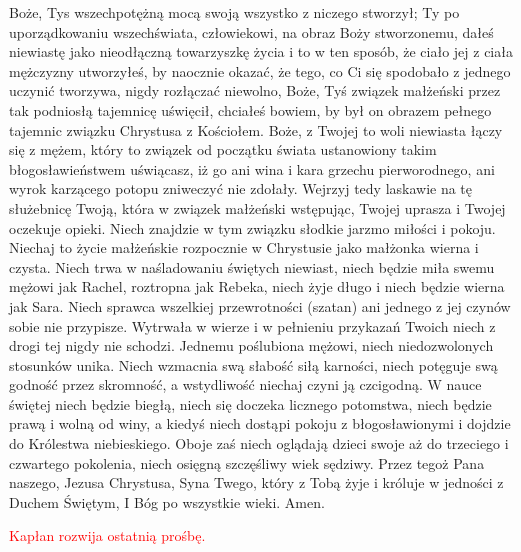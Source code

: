 \begin{Parallel}[v]{0.485\textwidth}{0.485\textwidth}
{Boże, Tys wszechpotężną mocą swoją wszystko z niczego stworzył; Ty po uporządkowaniu wszechświata, człowiekowi, na obraz Boży stworzonemu, dałeś niewiastę jako nieodłączną towarzyszkę życia i to w ten sposób, że ciało jej z ciała mężczyzny utworzyłeś, by naocznie okazać, że tego, co Ci się spodobało z jednego uczynić tworzywa, nigdy rozłączać niewolno, Boże, Tyś związek małżeński przez tak podniosłą tajemnicę uświęcił, chciałeś bowiem, by był on obrazem pełnego tajemnic związku Chrystusa z Kościołem. Boże, z Twojej to woli niewiasta łączy się z mężem, który to związek od początku świata ustanowiony takim błogosławieństwem uświącasz, iż go ani wina i kara grzechu pierworodnego, ani wyrok karzącego potopu zniweczyć nie zdołały. Wejrzyj tedy laskawie na tę służebnicę Twoją, która w związek małżeński wstępując, Twojej uprasza i Twojej oczekuje opieki. Niech znajdzie w tym związku słodkie jarzmo miłości i pokoju. Niechaj to życie małżeńskie rozpocznie w Chrystusie jako małżonka wierna i czysta. Niech trwa w naśladowaniu świętych niewiast, niech będzie miła swemu mężowi jak Rachel, roztropna jak Rebeka, niech żyje długo i niech będzie wierna jak Sara. Niech sprawca wszelkiej przewrotności (szatan) ani jednego z jej czynów sobie nie przypisze. Wytrwała w wierze i w pełnieniu przykazań Twoich niech z drogi tej nigdy nie schodzi. Jednemu poślubiona mężowi, niech niedozwolonych stosunków unika. Niech wzmacnia swą słabość siłą karności, niech potęguje swą godność przez skromność, a wstydliwość niechaj czyni ją czcigodną. W nauce świętej niech będzie biegłą, niech się doczeka licznego potomstwa, niech będzie prawą i wolną od winy, a kiedyś niech dostąpi pokoju z błogosławionymi i dojdzie do Królestwa niebieskiego. Oboje zaś niech oglądają dzieci swoje aż do trzeciego i czwartego pokolenia, niech osięgną szczęśliwy wiek sędziwy. Przez tegoż Pana naszego, Jezusa Chrystusa, Syna Twego, który z Tobą żyje i króluje w jedności z Duchem Świętym, I Bóg po wszystkie wieki. Amen.
}
\end{Parallel}

\begin{center}
\textcolor{red}{Kapłan rozwija ostatnią prośbę.}
\end{center}

